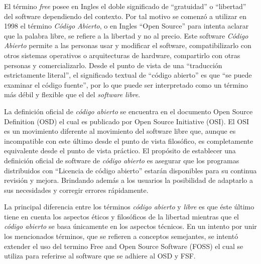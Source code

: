 El término \textit{free} posee en Ingles el doble significado
de ``gratuidad'' o ``libertad'' del software dependiendo del
contexto. Por tal motivo se comenzó a utilizar
en 1998 el término \textit{Código Abierto}, o en Ingles ``Open
Source'' para intenta aclarar que la palabra libre, se refiere a la libertad y no al precio. Este software \textit{Código Abierto} permite a las personas usar y modificar el software, compatibilizarlo con otros sistemas operativos o arquitecturas de hardware, compartirlo con otras personas y comercializarlo.
Desde el punto de vista de una ``traducción
estrictamente literal'', el significado textual de ``código abierto''
es que ``se puede examinar el código fuente'', por lo que puede ser
interpretado como un término más débil y flexible que el del
\textit{software libre}. 

La definición oficial de \textit{código abierto} se encuentra en el
documento Open Source Definition (OSD) el cual es publicado por Open
Source Initiative (OSI). El OSI es un movimiento diferente al
movimiento del software libre que, aunque es incompatible con este
último desde el punto de vista filosófico, es completamente
equivalente desde el punto de vista práctico. El propósito de
establecer una definición oficial de software de \textit{código
  abierto} es asegurar que los programas distribuidos con ``Licencia
de código abierto'' estarán disponibles para su continua revisión y
mejora. Brindando además a los usuarios la posibilidad de adaptarlo a
sus necesidades y corregir errores rápidamente.

La principal diferencia entre los términos \textit{código abierto} y
\textit{libre} es que éste último tiene en cuenta los aspectos éticos
y filosóficos de la libertad mientras que el \textit{código abierto}
se basa únicamente en los aspectos técnicos. En un intento por unir
los mencionados términos, que se refieren a conceptos semejantes, se
intentó extender el uso del termino Free and Open Source Software
(FOSS) el cual se utiliza para referirse al software que se adhiere al
OSD y FSF.


